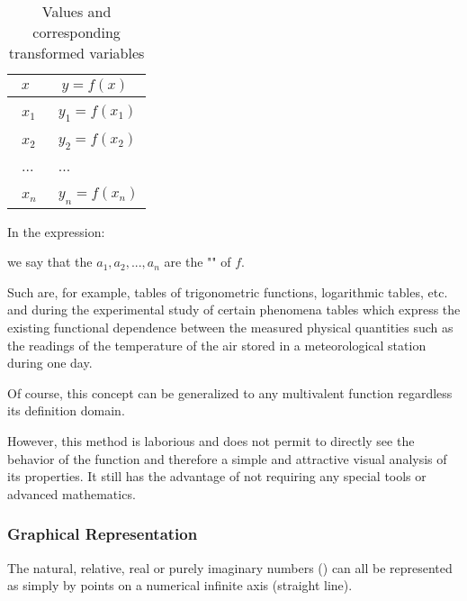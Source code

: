 	\begin{table}[H]
	\begin{center}
			\begin{tabular}{|p{2cm}|p{2.5cm}|}
				\hline
				\multicolumn{1}{c}{\cellcolor{black!30}\textbf{$x$}} & 
  \multicolumn{1}{c}{\cellcolor{black!30}\textbf{$y=f(x)$}} \\ \hline
				\centering\arraybackslash\ $x_1$ & \centering\arraybackslash\ $y_1=f(x_1)$ \\ \hline
				\centering\arraybackslash\ $x_2$ & \centering\arraybackslash\ $y_2=f(x_2)$  \\ \hline
				\centering\arraybackslash\ $...$ & \centering\arraybackslash\ $...$  \\ \hline
				\centering\arraybackslash\ $x_n$ & \centering\arraybackslash\ $y_n=f(x_n)$  \\ \hline
		\end{tabular}
	\end{center}
	\caption[]{Values and corresponding transformed variables}
	\end{table}	
	
	In the expression:
	
	we say that the $a_1,a_2,...,a_n$ are the "" of $f$.

Such are, for example, tables of trigonometric functions, logarithmic tables, etc. and during the experimental study of certain phenomena tables which express the existing functional dependence between the measured physical quantities such as the readings of the temperature of the air stored in a meteorological station during one day.

Of course, this concept can be generalized to any multivalent function regardless its definition domain.

However, this method is laborious and does not permit to directly see the behavior of the function and therefore a simple and attractive visual analysis of its properties. It still has the advantage of not requiring any special tools or advanced mathematics.

	\pagebreak
	\subsubsection{Graphical Representation}
	The natural, relative, real or purely imaginary numbers  () can all be represented as simply by points on a numerical infinite axis (straight line).

